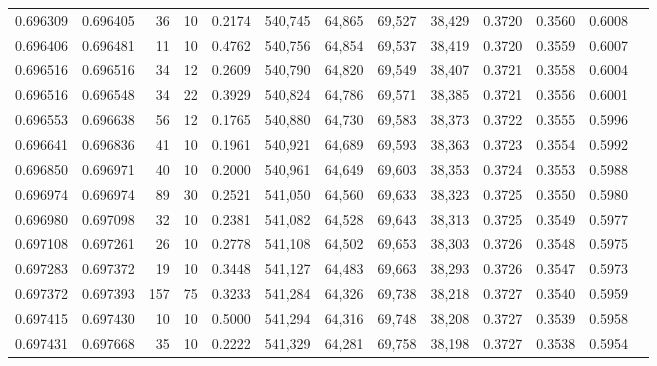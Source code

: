 \begin{tabular}{rrrrrrrrrrrrr}
0.696309 & 0.696405 &    36 &  10 &                                     0.2174 & 540,745 &  64,865 &  69,527 &  38,429 & 0.3720 & 0.3560 & 0.6008 \\
0.696406 & 0.696481 &    11 &  10 &                                     0.4762 & 540,756 &  64,854 &  69,537 &  38,419 & 0.3720 & 0.3559 & 0.6007 \\
0.696516 & 0.696516 &    34 &  12 &                                     0.2609 & 540,790 &  64,820 &  69,549 &  38,407 & 0.3721 & 0.3558 & 0.6004 \\
0.696516 & 0.696548 &    34 &  22 &                                     0.3929 & 540,824 &  64,786 &  69,571 &  38,385 & 0.3721 & 0.3556 & 0.6001 \\
0.696553 & 0.696638 &    56 &  12 &                                     0.1765 & 540,880 &  64,730 &  69,583 &  38,373 & 0.3722 & 0.3555 & 0.5996 \\
0.696641 & 0.696836 &    41 &  10 &                                     0.1961 & 540,921 &  64,689 &  69,593 &  38,363 & 0.3723 & 0.3554 & 0.5992 \\
0.696850 & 0.696971 &    40 &  10 &                                     0.2000 & 540,961 &  64,649 &  69,603 &  38,353 & 0.3724 & 0.3553 & 0.5988 \\
0.696974 & 0.696974 &    89 &  30 &                                     0.2521 & 541,050 &  64,560 &  69,633 &  38,323 & 0.3725 & 0.3550 & 0.5980 \\
0.696980 & 0.697098 &    32 &  10 &                                     0.2381 & 541,082 &  64,528 &  69,643 &  38,313 & 0.3725 & 0.3549 & 0.5977 \\
0.697108 & 0.697261 &    26 &  10 &                                     0.2778 & 541,108 &  64,502 &  69,653 &  38,303 & 0.3726 & 0.3548 & 0.5975 \\
0.697283 & 0.697372 &    19 &  10 &                                     0.3448 & 541,127 &  64,483 &  69,663 &  38,293 & 0.3726 & 0.3547 & 0.5973 \\
0.697372 & 0.697393 &   157 &  75 &                                     0.3233 & 541,284 &  64,326 &  69,738 &  38,218 & 0.3727 & 0.3540 & 0.5959 \\
0.697415 & 0.697430 &    10 &  10 &                                     0.5000 & 541,294 &  64,316 &  69,748 &  38,208 & 0.3727 & 0.3539 & 0.5958 \\
0.697431 & 0.697668 &    35 &  10 &                                     0.2222 & 541,329 &  64,281 &  69,758 &  38,198 & 0.3727 & 0.3538 & 0.5954 \\

\end{tabular}
